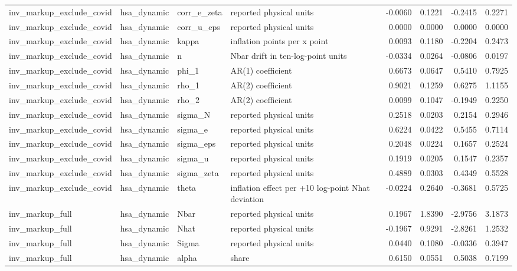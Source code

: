 \begin{tabular}{llllrrrr}
inv\_markup\_exclude\_covid & hsa\_dynamic & corr\_e\_zeta & reported physical units & -0.0060 & 0.1221 & -0.2415 & 0.2271 \\
inv\_markup\_exclude\_covid & hsa\_dynamic & corr\_u\_eps & reported physical units & 0.0000 & 0.0000 & 0.0000 & 0.0000 \\
inv\_markup\_exclude\_covid & hsa\_dynamic & kappa & inflation points per x point & 0.0093 & 0.1180 & -0.2204 & 0.2473 \\
inv\_markup\_exclude\_covid & hsa\_dynamic & n & Nbar drift in ten-log-point units & -0.0334 & 0.0264 & -0.0806 & 0.0197 \\
inv\_markup\_exclude\_covid & hsa\_dynamic & phi\_1 & AR(1) coefficient & 0.6673 & 0.0647 & 0.5410 & 0.7925 \\
inv\_markup\_exclude\_covid & hsa\_dynamic & rho\_1 & AR(2) coefficient & 0.9021 & 0.1259 & 0.6275 & 1.1155 \\
inv\_markup\_exclude\_covid & hsa\_dynamic & rho\_2 & AR(2) coefficient & 0.0099 & 0.1047 & -0.1949 & 0.2250 \\
inv\_markup\_exclude\_covid & hsa\_dynamic & sigma\_N & reported physical units & 0.2518 & 0.0203 & 0.2154 & 0.2946 \\
inv\_markup\_exclude\_covid & hsa\_dynamic & sigma\_e & reported physical units & 0.6224 & 0.0422 & 0.5455 & 0.7114 \\
inv\_markup\_exclude\_covid & hsa\_dynamic & sigma\_eps & reported physical units & 0.2048 & 0.0224 & 0.1657 & 0.2524 \\
inv\_markup\_exclude\_covid & hsa\_dynamic & sigma\_u & reported physical units & 0.1919 & 0.0205 & 0.1547 & 0.2357 \\
inv\_markup\_exclude\_covid & hsa\_dynamic & sigma\_zeta & reported physical units & 0.4889 & 0.0303 & 0.4349 & 0.5528 \\
inv\_markup\_exclude\_covid & hsa\_dynamic & theta & inflation effect per +10 log-point Nhat deviation & -0.0224 & 0.2640 & -0.3681 & 0.5725 \\
inv\_markup\_full & hsa\_dynamic & Nbar & reported physical units & 0.1967 & 1.8390 & -2.9756 & 3.1873 \\
inv\_markup\_full & hsa\_dynamic & Nhat & reported physical units & -0.1967 & 0.9291 & -2.8261 & 1.2532 \\
inv\_markup\_full & hsa\_dynamic & Sigma & reported physical units & 0.0440 & 0.1080 & -0.0336 & 0.3947 \\
inv\_markup\_full & hsa\_dynamic & alpha & share & 0.6150 & 0.0551 & 0.5038 & 0.7199 \\

\end{tabular}
